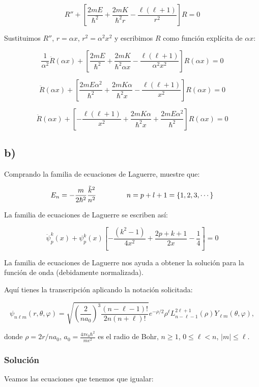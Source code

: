 \documentclass[a4paper]{article}
\begin{document}
$$R'' + \left[ \frac{2mE}{\hbar^2} + \frac{2mK}{\hbar^2 r} - \frac{\ell(\ell+1)}{r^2} \right] R = 0$$

Sustituimos $R''$, $r = \alpha x$, $r^2 = \alpha^2 x^2$ y escribimos $R$ como función explícita de $\alpha x$:

$$\frac{1}{\alpha^2} \ddot{R}(\alpha x) + \left[ \frac{2mE}{\hbar^2} + \frac{2mK}{\hbar^2 \alpha x} - \frac{\ell(\ell+1)}{\alpha^2 x^2} \right] R(\alpha x) = 0$$

$$\ddot{R}(\alpha x) + \left[ \frac{2mE\alpha^2}{\hbar^2} + \frac{2mK\alpha}{\hbar^2 x} - \frac{\ell(\ell+1)}{x^2} \right] R(\alpha x) = 0$$

$$\ddot{R}(\alpha x) + \left[ -\frac{\ell(\ell+1)}{x^2} + \frac{2mK\alpha}{\hbar^2 x} + \frac{2mE\alpha^2}{\hbar^2} \right] R(\alpha x) = 0$$



\subsection{b)}
Comprando la familia de ecuaciones de Laguerre, muestre que:

$$
E_n = -\frac{m}{2\hbar^2}\frac{\tilde{k}^2}{n^2} \hspace{1.5cm} n = p + l + 1 = \{1, 2, 3, \cdots \}
$$

La familia de ecuaciones de Laguerre se escriben así:

$$\ddot{\psi}_p^k(x) + \psi_p^k(x) \left[ -\frac{(k^2 - 1)}{4x^2} + \frac{2p + k + 1}{2x} - \frac{1}{4} \right] = 0$$

La familia de ecuaciones de Laguerre nos ayuda a obtener la solución para la función de onda (debidamente normalizada).

Aquí tienes la transcripción aplicando la notación solicitada:

$$\psi_{n\ell m}(r, \theta, \varphi) = \sqrt{ \left( \frac{2}{na_0} \right)^3 \frac{(n-\ell-1)!}{2n(n+\ell)!} } e^{-\rho/2} \rho^\ell L_{n-\ell-1}^{2\ell+1}(\rho) Y_{\ell m}(\theta, \varphi) ,$$

donde $\rho = 2r/na_0$, $a_0 = \frac{4\pi\epsilon_0\hbar^2}{me^2}$ es el radio de Bohr, $n \geq 1$, $0 \leq \ell < n$, $|m| \leq \ell$.

\subsubsection{Solución}

Veamos las ecuaciones que tenemos que igualar:
\end{document}
